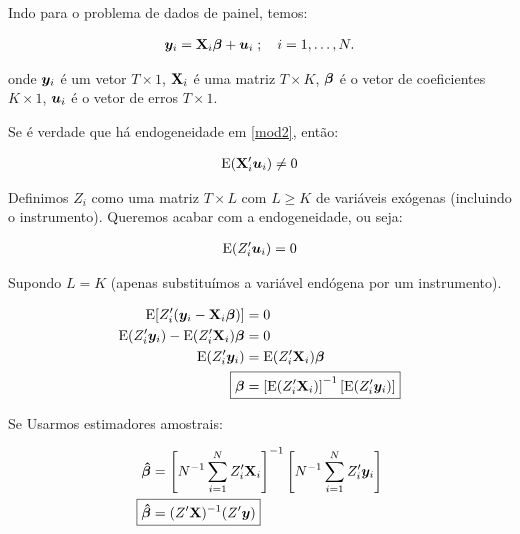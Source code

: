 \documentclass[11pt, oneside, a4paper, article]{article}
\numberwithin{equation}{section}
\begin{document}
\begin{description}
	Indo para o problema de dados de painel, temos:

	\vspace{-1 em}
	\begin{align} \label{mod2}
		\boldsymbol{y}_{i} = \mathbf{X}_{i} \boldsymbol{\beta} + \boldsymbol{u}_{i}
		\; ; \quad i = 1, \dots, N.
	\end{align}

	\noindent
	onde 
	$\boldsymbol{y}_{i}$ é um vetor $T \times 1$,
	$\mathbf{X}_{i}$ é uma matriz $T \times K$,
	$\boldsymbol{\beta}$ é o vetor de coeficientes $K \times 1$,
	$\boldsymbol{u}_{i}$ é o vetor de erros $T \times 1$.

	Se é verdade que há endogeneidade em \eqref{mod2}, então:

	\vspace{-1 em}
	\begin{align*}
		\text{E}(\mathbf{X}_{i}^{\prime} \boldsymbol{u}_{i}) \neq 0
	\end{align*}

	Definimos $Z_{i}$ como uma matriz $T \times L$ com $L \geq K$ de variáveis exógenas (incluindo o instrumento).
	Queremos acabar com a endogeneidade, ou seja:

	\vspace{-1 em}
	\begin{align*}
		\text{E}(Z_{i}^{\prime} \boldsymbol{u}_{i}) = 0
	\end{align*}

	Supondo $L = K$ (apenas substituímos a variável endógena por um instrumento).

	\vspace{-1 em}
	\begin{align*}
		\E[ Z_{i}^{\prime} ( \yvec_{i} - \Xmat_{i} \betavec ) ] &= 0
		\\
		\E( Z_{i}^{\prime} \yvec_{i} ) - \E( Z_{i}^{\prime} \Xmat_{i} ) \betavec &= 0
		\\
		\E( Z_{i}^{\prime} \yvec_{i} ) &= \E( Z_{i}^{\prime} \Xmat_{i} ) \betavec
		\\
		\Aboxed{
			\betavec &=
			\left[ \E( Z_{i}^{\prime} \Xmat_{i} ) \right]^{-1}
			\left[ \E( Z_{i}^{\prime} \yvec_{i} ) \right]
		}
	\end{align*}

	Se Usarmos estimadores amostrais:

	\vspace{-1 em}
	\begin{align*}
		\mbs{\hat{\beta}} &=
		\left[ N^{-1} \sum_{i=1}^{N} Z_{i}^{\prime} \Xmat_{i} \right]^{-1}
		\left[ N^{-1} \sum_{i=1}^{N} Z_{i}^{\prime} \yvec_{i} \right]
		\\
		\Aboxed{
			\mbs{\hat{\beta}} &=
		( Z^{\prime} \Xmat )^{-1} ( Z^{\prime} \yvec ) }
	\end{align*}


\end{description}
\end{document}
